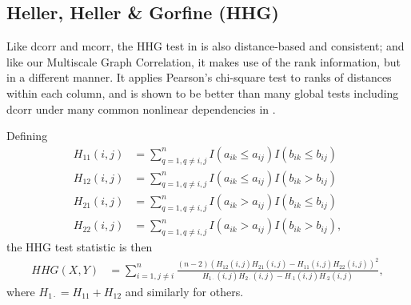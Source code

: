 \documentclass[11pt]{article}
\begin{document}

\subsection{Heller, Heller \& Gorfine (HHG)}
\label{sec:hhg}
Like dcorr and mcorr, the HHG test in \cite{HellerGorfine2013} is also distance-based and consistent; and like our Multiscale Graph Correlation, it makes use of the rank information, but in a different manner. It applies Pearson's chi-square test to ranks of distances within each column, and is shown to be better than many global tests including dcorr under many common nonlinear dependencies in \cite{GorfineHellerHeller2012, HellerGorfine2013}. 

Defining 
\begin{align*}
H_{11}(i,j) &= \sum_{q=1,q\neq i,j}^{n}I(a_{ik} \leq a_{ij})I(b_{ik} \leq b_{ij}) \\
H_{12}(i,j) &= \sum_{q=1,q\neq i,j}^{n}I(a_{ik} \leq a_{ij})I(b_{ik} > b_{ij}) \\
H_{21}(i,j) &= \sum_{q=1,q\neq i,j}^{n}I(a_{ik} > a_{ij})I(b_{ik} \leq b_{ij}) \\
H_{22}(i,j) &= \sum_{q=1,q\neq i,j}^{n}I(a_{ik} > a_{ij})I(b_{ik} > b_{ij}),
\end{align*}
the HHG test statistic is then
\begin{align*}
HHG(X,Y) &= \sum_{i=1,j\neq i}^{n} \frac{(n-2)(H_{12}(i,j)H_{21}(i,j)-H_{11}(i,j)H_{22}(i,j))^2}{H_{1 \cdot}(i,j)H_{2 \cdot}(i,j)-H_{\cdot 1}(i,j)H_{\cdot 2}(i,j)},
\end{align*}
where $H_{1 \cdot}=H_{11}+H_{12}$ and similarly for others.
\end{document}
